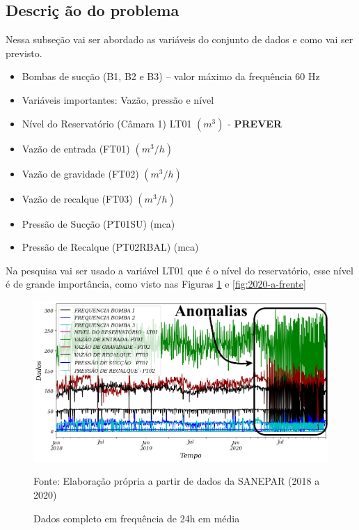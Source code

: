 \subsection{Descri\c c \~ao do problema} \label{subsec:descricao}

Nessa subseção vai ser abordado as variáveis do conjunto de dados e como vai ser previsto.

\begin{itemize}
\item Bombas de sucção (B1, B2 e B3) – valor máximo da frequência 60 Hz

\item[] Variáveis importantes: Vazão, pressão e nível

\item Nível do Reservatório (Câmara 1) LT01 $ (m^3) $ - \textbf{PREVER}

\item Vazão de entrada (FT01) $ (m^3/h) $

\item Vazão de gravidade (FT02) $ (m^3/h) $

\item Vazão de recalque (FT03) $ (m^3/h) $

\item Pressão de Sucção (PT01SU) (mca)

\item Pressão de Recalque (PT02RBAL) (mca)
\end{itemize}


Na pesquisa vai ser usado a variável LT01 que é o nível do reservatório, esse nível é de grande importância, como visto nas Figuras \ref{fig:dados-todos} e \ref{fig:2020-a-frente} 

\begin{figure}[H]
	\centering
	\caption{Dados completo em frequência de 24h em média}
	\label{fig:dados-todos}
	\includegraphics[width=1\linewidth]{"Introducao/Figuras/dados todos"}
	
	Fonte: Elaboração própria a partir de dados da SANEPAR (2018 a 2020)
\end{figure}

